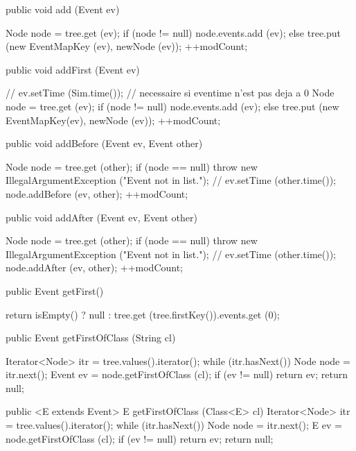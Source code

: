 \begin{hide}
\begin{code}
   public void add (Event ev)\begin{hide} {
      Node node = tree.get (ev);
      if (node != null)
         node.events.add (ev);
      else
         tree.put (new EventMapKey (ev), newNode (ev));
      ++modCount;
   }\end{hide}

   public void addFirst (Event ev)\begin{hide} {
 //     ev.setTime (Sim.time());   // necessaire si eventime n'est pas deja a 0
      Node node = tree.get (ev);
      if (node != null)
         node.events.add (ev);
      else
         tree.put (new EventMapKey(ev), newNode (ev));
      ++modCount;
   }\end{hide}

   public void addBefore (Event ev, Event other)\begin{hide} {
      Node node = tree.get (other);
      if (node == null)
         throw new IllegalArgumentException ("Event not in list.");
   //   ev.setTime (other.time());
      node.addBefore (ev, other);
      ++modCount;
   }\end{hide}

   public void addAfter (Event ev, Event other)\begin{hide} {
      Node node = tree.get (other);
      if (node == null)
         throw new IllegalArgumentException ("Event not in list.");
   //   ev.setTime (other.time());
      node.addAfter (ev, other);
      ++modCount;
   }\end{hide}

   public Event getFirst()\begin{hide} {
      return isEmpty() ? null :
         tree.get (tree.firstKey()).events.get (0);
   }\end{hide}

   public Event getFirstOfClass (String cl)\begin{hide} {
      Iterator<Node> itr = tree.values().iterator();
      while (itr.hasNext()) {
         Node node = itr.next();
         Event ev = node.getFirstOfClass (cl);
         if (ev != null)
            return ev;
      }
      return null;
   }

   public <E extends Event> E getFirstOfClass (Class<E> cl) {
      Iterator<Node> itr = tree.values().iterator();
      while (itr.hasNext()) {
         Node node = itr.next();
         E ev = node.getFirstOfClass (cl);
         if (ev != null)
            return ev;
      }
      return null;
   }\end{hide}


\end{code}
\end{hide}
